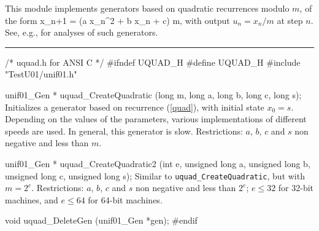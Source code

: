 
This module implements generators based on quadratic recurrences
modulo $m$, of the form
\eq
  x_{n+1} = (a x_n^2 + b x_n + c) \mod m,          
\endeq
with output $u_n = x_n/m$ at step $n$.
See, e.g., \cite{rEIC87a,rEIC97d,rEMM97a,rKNU98a}
for analyses of such generators.


\bigskip
\hrule
\code
\hide
/* uquad.h for ANSI C */
#ifndef UQUAD_H
#define UQUAD_H
\endhide
#include "TestU01/unif01.h"


unif01_Gen * uquad_CreateQuadratic (long m, long a, long b, long c, long s);
\endcode
  \tab  Initializes a generator based on recurrence (\ref{quad}),
   with initial state $x_0 = s$.
%
   Depending on the values of the parameters, various implementations
   of different speeds are used.  In general, this generator
   is slow.  Restrictions: $a$, $b$, $c$ and $s$ non
   negative and less than $m$.
 \endtab
\code


unif01_Gen * uquad_CreateQuadratic2 (int e, unsigned long a,
    unsigned long b, unsigned long c, unsigned long s);
\endcode
  \tab  Similar to {\tt uquad\_CreateQuadratic}, but with $m=2^e$.
   Restrictions: $a$, $b$, $c$ and $s$ non negative and
   less than $2^e$; $e \le 32$ for 32-bit machines,
   and $e \le 64$ for 64-bit machines.
 \endtab


\code

void uquad_DeleteGen (unif01_Gen *gen);
\endcode
 \tab \DelGen
 \endtab
\code
\hide
#endif
\endhide
\endcode
